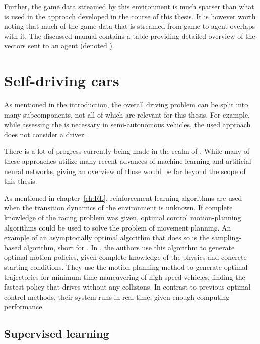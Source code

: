 Further, the game data streamed by this environment is much sparser than what is used in the approach developed in the course of this thesis. It is however worth noting that much of the game data that is streamed from game to agent overlaps with it. The discussed manual \cite{loiacono_simulated_2013} contains a table providing detailed overview of the vectors sent to an agent (denoted ).

\section{Self-driving cars}

As mentioned in the introduction, the overall driving problem can be split into many subcomponents, not all of which are relevant for this thesis. For example, while assessing the  is necessary in semi-autonomous vehicles, the used approach does not consider a driver. 

There is a lot of progress currently being made in the realm of . While many of these approaches utilize many recent advances of machine learning and artificial neural networks, giving an overview of those would be far beyond the scope of this thesis.

As mentioned in chapter~\ref{ch:RL}, reinforcement learning algorithms are used when the transition dynamics of the environment is unknown. If complete knowledge of the racing problem was given, optimal control motion-planning algorithms could be used to solve the problem of movement planning. An example of an asymptocially optimal algorithm that does so is the sampling-based  algorithm, short for . In \cite{hwan_jeon_anytime_2011}, the authors use this algorithm to generate optimal motion policies, given complete knowledge of the physics and concrete starting conditions. They use the motion planning method to generate optimal trajectories for minimum-time maneuvering of high-speed vehicles, finding the fastest policy that drives without any collisions. In contrast to previous optimal control methods, their system runs in real-time, given enough computing performance. 

\subsection{Supervised learning}

